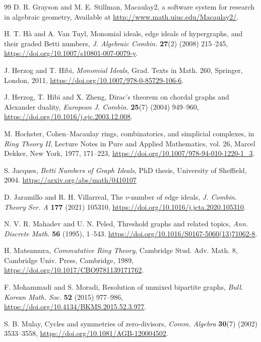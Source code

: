 \documentclass[12pt]{article}
\theoremstyle{definition}
\begin{document}
\begin{thebibliography}{99}
D. R. Grayson and M. E. Stillman,
Macaulay2, a software system for research in algebraic geometry,
Available at \url{http://www.math.uiuc.edu/Macaulay2/}.

H. T. H\`a and A. Van Tuyl,
Monomial ideals, edge ideals of hypergraphs, and their graded Betti numbers,
\emph{J. Algebraic Combin.} \textbf{27}(2) (2008) 215--245,
\url{https://doi.org/10.1007/s10801-007-0079-y}.

J. Herzog and T. Hibi,
\emph{Monomial Ideals},
Grad. Texts in Math. 260, Springer, London, 2011,
\url{https://doi.org/10.1007/978-0-85729-106-6}.

J. Herzog, T. Hibi and X. Zheng,
Dirac's theorem on chordal graphs and Alexander duality,
\emph{European J. Combin.} \textbf{25}(7) (2004) 949--960,
\url{https://doi.org/10.1016/j.ejc.2003.12.008}.

M. Hochster,
Cohen--Macaulay rings, combinatorics, and simplicial complexes,
in \emph{Ring Theory II},
Lecture Notes in Pure and Applied Mathematics, vol. 26,
Marcel Dekker, New York, 1977, 171--223,
\url{https://doi.org/10.1007/978-94-010-1220-1_3}.

S. Jacques,
\emph{Betti Numbers of Graph Ideals},
PhD thesis, University of Sheffield, 2004.
\url{https://arxiv.org/abs/math/0410107}

D. Jaramillo and R. H. Villarreal,
The \(v\)-number of edge ideals,
\emph{J. Combin. Theory Ser. A} \textbf{177} (2021) 105310,
\url{https://doi.org/10.1016/j.jcta.2020.105310}.

N. V. R. Mahadev and U. N. Peled, Threshold graphs and related topics,
\emph{Ann. Discrete Math.} \textbf{56} (1995), 1--543.
\url{https://doi.org/10.1016/S0167-5060(13)71062-8}.

H. Matsumura,
\emph{Commutative Ring Theory},
Cambridge Stud. Adv. Math. 8, Cambridge Univ. Press, Cambridge, 1989,
\url{https://doi.org/10.1017/CBO9781139171762}.

F. Mohammadi and S. Moradi,
Resolution of unmixed bipartite graphs,
\emph{Bull. Korean Math. Soc.} \textbf{52} (2015) 977--986,
\url{https://doi.org/10.4134/BKMS.2015.52.3.977}.

S. B. Mulay,
Cycles and symmetries of zero-divisors,
\emph{Comm. Algebra} \textbf{30}(7) (2002) 3533--3558,
\url{https://doi.org/10.1081/AGB-120004502}.


\end{thebibliography}
\end{document}
